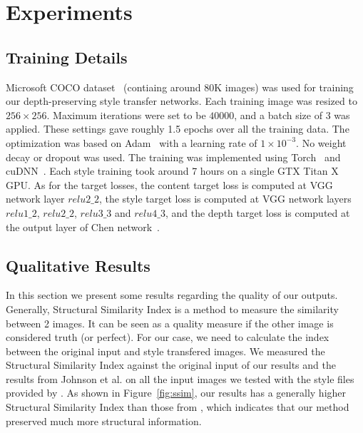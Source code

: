 \documentclass[10pt,twocolumn,letterpaper]{article}
\begin{document}
\section{Experiments}

\subsection{Training Details}

Microsoft COCO dataset~\cite{lin2014microsoft} (contiaing around 80K images) was used for training our depth-preserving style transfer networks. Each training image was resized to $256\times256$. Maximum iterations were set to be $40000$, and a batch size of 3 was applied. These settings gave roughly 1.5 epochs over all the training data. The optimization was based on Adam~\cite{kingma2014adam} with a learning rate of $1\times10^{-3}$. No weight decay or dropout was used. The training was implemented using Torch~\cite{collobert2011torch7} and cuDNN~\cite{chetlur2014cudnn}. Each style training took around 7 hours on a single GTX Titan X GPU. As for the target losses, the content target loss is computed at VGG network layer $relu2\_2$, the style target loss is computed at VGG network layers $relu1\_2$, $relu2\_2$, $relu3\_3$ and $relu4\_3$, and the depth target loss is computed at the output layer of Chen \etal network~\cite{chen2016single}.


\subsection{Qualitative Results}
In this section we present some results regarding the quality of our outputs. Generally, Structural Similarity Index is a method to measure the similarity between 2 images. It can be seen as a quality measure if the other image is considered truth (or perfect). For our case, we need to calculate the index between the original input and style transfered images. We measured the Structural Similarity Index against the original input of our results and the results from Johnson et al. \cite{johnson2016perceptual} on all the input images we tested with the style files provided by \cite{johnson2016perceptual}.
As shown in Figure~\ref{fig:ssim}, our results has a generally higher Structural Similarity Index than those from \cite{johnson2016perceptual}, which indicates that our method preserved much more structural information.
\end{document}

